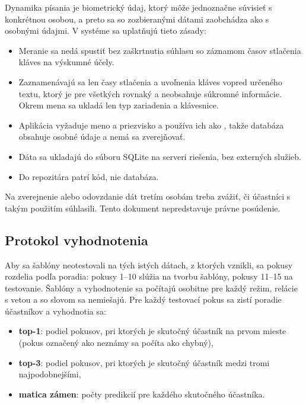 Dynamika písania je biometrický údaj, ktorý môže jednoznačne súvisieť
s konkrétnou osobou, a preto sa so zozbieranými dátami zaobchádza ako
s osobnými údajmi. V systéme sa uplatňujú tieto zásady:
\begin{itemize}
  \item Meranie sa nedá spustiť bez zaškrtnutia súhlasu so záznamom časov
        stlačenia kláves na výskumné účely.
  \item Zaznamenávajú sa len časy stlačenia a uvoľnenia kláves vopred
        určeného textu, ktorý je pre všetkých rovnaký a neobsahuje súkromné
        informácie. Okrem mena sa ukladá len typ zariadenia a klávesnice.
  \item Aplikácia vyžaduje meno a priezvisko a používa ich ako
        , takže databáza obsahuje osobné údaje
        a nemá sa zverejňovať.
  \item Dáta sa ukladajú do súboru SQLite na serveri riešenia, bez
        externých služieb.
  \item Do repozitára patrí kód, nie databáza.
\end{itemize}

Na zverejnenie alebo odovzdanie dát tretím osobám treba zvážiť, či účastníci
s takým použitím súhlasili. Tento dokument nepredstavuje právne posúdenie.

\subsection{Protokol vyhodnotenia}
\label{sec:protokol}

Aby sa šablóny neotestovali na tých istých dátach, z ktorých vznikli, sa
pokusy rozdelia podľa poradia: pokusy 1--10 slúžia na tvorbu šablóny,
pokusy 11--15 na testovanie. Šablóny a vyhodnotenie sa počítajú osobitne pre
každý režim, relácie s vetou a so slovom sa nemiešajú. Pre každý testovací pokus sa zistí poradie
účastníkov a vyhodnotia sa:
\begin{itemize}
  \item \textbf{top-1}: podiel pokusov, pri ktorých je skutočný účastník
        na prvom mieste (pokus označený ako neznámy sa počíta ako chybný),
  \item \textbf{top-3}: podiel pokusov, pri ktorých je skutočný účastník
        medzi tromi najpodobnejšími,
  \item \textbf{matica zámen}: počty predikcií pre každého skutočného
        účastníka.
\end{itemize}

